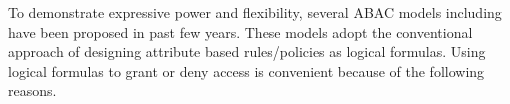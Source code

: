 	
	
	
	




To demonstrate expressive power and flexibility, several ABAC models including  \cite{abacAlpha,hgabac,abac-for-web-service} have been proposed in past few years. These models adopt the conventional approach of designing attribute based rules/policies as logical formulas. Using logical formulas to grant or deny access is convenient because of the following reasons.

